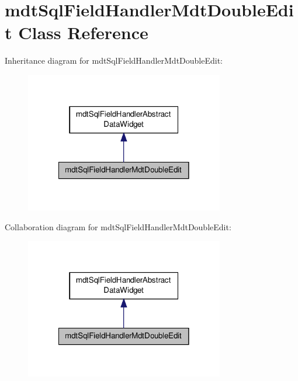 \hypertarget{classmdt_sql_field_handler_mdt_double_edit}{\section{mdt\-Sql\-Field\-Handler\-Mdt\-Double\-Edit Class Reference}
\label{classmdt_sql_field_handler_mdt_double_edit}
}


Inheritance diagram for mdt\-Sql\-Field\-Handler\-Mdt\-Double\-Edit\-:
\nopagebreak
\begin{figure}[H]
\begin{center}
\leavevmode
\includegraphics[width=246pt]{classmdt_sql_field_handler_mdt_double_edit__inherit__graph}
\end{center}
\end{figure}


Collaboration diagram for mdt\-Sql\-Field\-Handler\-Mdt\-Double\-Edit\-:
\nopagebreak
\begin{figure}[H]
\begin{center}
\leavevmode
\includegraphics[width=246pt]{classmdt_sql_field_handler_mdt_double_edit__coll__graph}
\end{center}
\end{figure}
